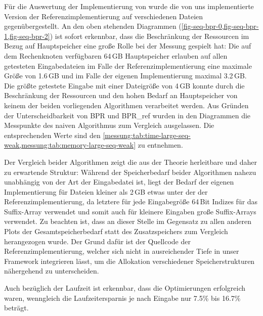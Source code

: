 Für die Auswertung der Implementierung von \bpr wurde die von uns implementierte Version der Referenzimplementierung auf verschiedenen Dateien gegenübergestellt.
An den oben stehenden Diagrammen (\cref{fig-seq-bpr-0,fig-seq-bpr-1,fig-seq-bpr-2}) ist sofort erkennbar, dass die Beschränkung der Ressourcen im Bezug auf Hauptspeicher eine große Rolle bei der Messung gespielt hat:
Die auf dem Rechenknoten verfügbaren 64\,GB Hauptspeicher erlauben auf allen getesteten Eingabedateien im Falle der Referenzimplementierung eine maximale Größe von 1.6\,GB und im Falle der eigenen Implementierung maximal 3.2\,GB.
Die größte getestete Eingabe mit einer Dateigröße von 4\,GB konnte durch die Beschränkung der Ressourcen und den hohen Bedarf an Hauptspeicher von keinem der beiden vorliegenden Algorithmen verarbeitet werden.
Aus Gründen der Unterscheidbarkeit von BPR und BPR\_ref wurden in den Diagrammen die Messpunkte des naiven Algorithmus zum Vergleich ausgelassen.
Die entsprechenden Werte sind den \cref{messung:tab:time-large-seq-weak,messung:tab:memory-large-seq-weak} zu entnehmen.\par
Der Vergleich beider Algorithmen zeigt die aus der Theorie herleitbare und daher zu erwartende Struktur:
Während der Speicherbedarf beider Algorithmen nahezu unabhängig von der Art der Eingabedatei ist, liegt der Bedarf der eigenen Implementierung für Dateien kleiner als 2\,GB etwas unter der der Referenzimplementierung, da letztere für jede Eingabegröße 64\,Bit Indizes für das Suffix-Array verwendet und somit auch für kleinere Eingaben große Suffix-Arrays verwendet.
Zu beachten ist, dass an dieser Stelle im Gegensatz zu allen anderen Plots der Gesamtspeicherbedarf statt des Zusatzspeichers zum Vergleich herangezogen wurde.
Der Grund dafür ist der Quellcode der Referenzimplementierung, welcher sich nicht in ausreichender Tiefe in unser Framework integrieren lässt, um die Allokation verschiedener Speicherstrukturen nähergehend zu unterscheiden.\par
Auch bezüglich der Laufzeit ist erkennbar, dass die Optimierungen erfolgreich waren, wenngleich die Laufzeitersparnis je nach Eingabe nur 7.5\% bis 16.7\% beträgt.


